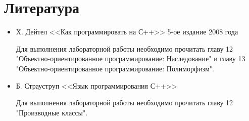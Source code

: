 \documentclass[a4paper,12pt]{article}
\begin{document}
\section{Литература}
\label{sec:Literature}

\begin{itemize}
\item Х. Дейтел <<Как программировать на С++>> 5-ое издание 2008 года

  Для выполнения лабораторной работы необходимо прочитать главу 12
  "Объектно-ориентированное программирование: Наследование" и главу 13
  "Объектно-ориентированное программирование: Полиморфизм".
\item Б. Страуструп <<Язык программирования С++>>
  
  Для выполнения лабораторной работы необходимо прочитать главу 12
  "Производные классы".
\end{itemize}
\end{document}
